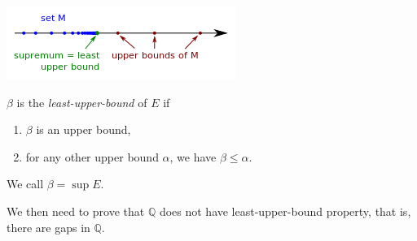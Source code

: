 \documentclass{article}
\begin{document}
    \includegraphics{supremum}
    
    $\beta$ is the \textit{least-upper-bound} of $E$ if
    
    \begin{enumerate}
        \item $\beta$ is an upper bound,
        \item for any other upper bound $\alpha$, we have $\beta \leq \alpha$.
    \end{enumerate}

    We call $\beta = \sup E$.
    
    We then need to prove that $\mathbb{Q}$ does not have least-upper-bound property, that is, there are gaps in $\mathbb{Q}$.
    
\end{document}
